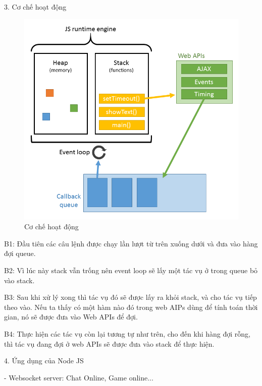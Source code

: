 \documentclass{report}
\begin{document}
\bigskip
\setlength{\parindent}{0cm}
3. Cơ chế hoạt động
\begin{center}
    \begin{figure}[htp]
    \begin{center}
     \includegraphics[scale=.3]{1.png}
    \end{center}
    \caption{Cơ chế hoạt động}
    \label{refhinh1}
    \end{figure}
\end{center}

\smallskip
\setlength{\parindent}{1cm}
B1: Đầu tiên các câu lệnh được chạy lần lượt từ trên xuống dưới và đưa vào hàng đợi queue.

B2: Vì lúc này stack vẫn trống nên event loop sẽ lấy một tác vụ ở trong queue bỏ vào stack. 

B3: Sau khi xử lý xong thì tác vụ đó sẽ được lấy ra khỏi stack, và cho tác vụ tiếp theo vào. Nếu ta thấy có một hàm nào đó trong web AIPs dùng để tính toán thời gian, nó sẽ được đưa vào Web APIs để đợi.

B4: Thực hiện các tác vụ còn lại tương tự như trên, cho đến khi hàng đợi rỗng, thì tác vụ đang đợi ở web APIs sẽ được đưa vào stack để thực hiện.


\bigskip
\setlength{\parindent}{0cm}
4. Ứng dụng của Node JS

\smallskip
\setlength{\parindent}{1cm}
- Websocket server: Chat Online, Game online...
\end{document}
